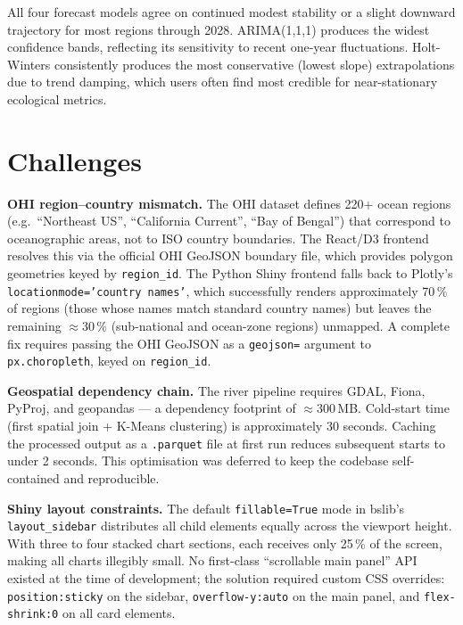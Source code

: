\documentclass[10pt,twocolumn]{article}
\newcommand{\tool}[1]{\texttt{#1}}
\begin{document}
All four forecast models agree on continued modest stability or a slight
downward trajectory for most regions through 2028.
ARIMA(1,1,1) produces the widest confidence bands, reflecting its
sensitivity to recent one-year fluctuations.
Holt-Winters consistently produces the most conservative (lowest slope)
extrapolations due to trend damping, which users often find most credible
for near-stationary ecological metrics.

\section{Challenges}

\textbf{OHI region--country mismatch.}
The OHI dataset defines 220+ ocean regions (e.g.\ ``Northeast US'',
``California Current'', ``Bay of Bengal'') that correspond to oceanographic
areas, not to ISO country boundaries.
The React/D3 frontend resolves this via the official OHI GeoJSON boundary
file, which provides polygon geometries keyed by \tool{region\_id}.
The Python Shiny frontend falls back to Plotly's
\tool{locationmode='country names'}, which successfully renders approximately
70\,\% of regions (those whose names match standard country names) but leaves
the remaining $\approx$30\,\% (sub-national and ocean-zone regions) unmapped.
A complete fix requires passing the OHI GeoJSON as a
\tool{geojson=} argument to \tool{px.choropleth}, keyed on \tool{region\_id}.

\textbf{Geospatial dependency chain.}
The river pipeline requires GDAL, Fiona, PyProj, and geopandas ---
a dependency footprint of $\approx$300\,MB.
Cold-start time (first spatial join + K-Means clustering) is approximately
30 seconds.
Caching the processed output as a \tool{.parquet} file at first run reduces
subsequent starts to under 2 seconds.
This optimisation was deferred to keep the codebase self-contained and
reproducible.

\textbf{Shiny layout constraints.}
The default \tool{fillable=True} mode in bslib's \tool{layout\_sidebar}
distributes all child elements equally across the viewport height.
With three to four stacked chart sections, each receives only 25\,\% of
the screen, making all charts illegibly small.
No first-class ``scrollable main panel'' API existed at the time of
development; the solution required custom CSS overrides:
\tool{position:sticky} on the sidebar, \tool{overflow-y:auto} on the main
panel, and \tool{flex-shrink:0} on all card elements.
\end{document}
